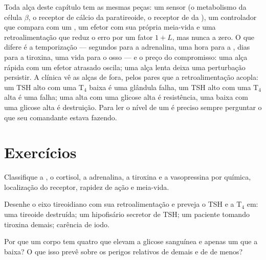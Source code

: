 \begin{remark}\label{rem:b3:endocrinology:control}
Toda alça deste capítulo tem as mesmas peças: um sensor (o metabolismo
da célula $\beta$, o receptor de cálcio da paratireoide, o receptor de
 da ), um controlador que compara com um
, um  efetor com sua própria meia-vida e uma
retroalimentação que reduz o erro por um fator $1 + L$, mas nunca a
zero. O que difere é a temporização --- segundos para a adrenalina, uma
hora para a , dias para a tiroxina, uma vida para o osso --- e o
preço do compromisso: uma alça rápida com um efetor atrasado oscila; uma
alça lenta deixa uma perturbação persistir. A clínica vê as alças de
fora, pelos pares que a retroalimentação acopla: um TSH alto com uma
T$_{4}$ baixa é uma glândula falha, um TSH alto com uma T$_{4}$ alta é
uma  falha; uma  alta com uma glicose alta é
resistência, uma  baixa com uma glicose alta é destruição. Para
ler o nível de um  é preciso sempre perguntar o que seu
comandante estava fazendo.
\end{remark}

\section{Exercícios}

\begin{exercise}[$\star$]\label{exo:b3:endocrinology:1}
Classifique a , o cortisol, a adrenalina, a tiroxina e a
vasopressina por química, localização do receptor, rapidez de ação e
meia-vida.
\end{exercise}

\begin{exercise}[$\star$]\label{exo:b3:endocrinology:2}
Desenhe o eixo tireoidiano com sua retroalimentação e preveja o TSH e a
T$_{4}$ em: uma tireoide destruída; um  hipofisário secretor de
TSH; um paciente tomando tiroxina demais; carência de iodo.
\end{exercise}

\begin{exercise}[$\star$]\label{exo:b3:endocrinology:3}
Por que um corpo tem quatro  que elevam a glicose sanguínea e
apenas um que a baixa? O que isso prevê sobre os perigos relativos de
 demais e de  de menos?
\end{exercise}

